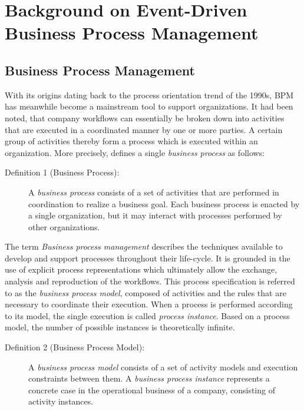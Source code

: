 \chapter{Background on Event-Driven Business Process Management}\label{ch:background}

\section{Business Process Management}
With its origins dating back to the process orientation trend of the 1990s, \ac{BPM} has meanwhile become a mainstream tool to support organizations.
It had been noted, that company workflows can essentially be broken down into activities that are executed in a coordinated manner by one or more parties.
A certain group of activities thereby form a process which is executed within an organization.
More precisely, \citeauthor{weske:bpm-book} \cite{weske:bpm-book} defines a single \emph{business process} as follows:

\begin{description}
	\item[Definition 1 (Business Process):]
	A \emph{business process} consists of a set of activities that are performed in coordination to realize a business goal. Each business process is enacted by a single organization, but it may interact with processes performed by other organizations. \cite[p.~5]{weske:bpm-book}
\end{description}

\noindent The term \emph{Business process management} describes the techniques available to develop and support processes throughout their life-cycle.
It is grounded in the use of explicit process representations which ultimately allow the exchange, analysis and reproduction of the workflows.
This process specification is referred to as the \emph{business process model}, composed of activities and the rules that are necessary to coordinate their execution. When a process is performed according to its model, the single execution is called \textit{process instance}.
Based on a process model, the number of possible instances is theoretically infinite.

\begin{description}
	\item[Definition 2 (Business Process Model):]
	A \emph{business process model} consists of a set of activity models and execution constraints between them. A \emph{business process instance} represents a concrete case in the operational business of a company, consisting of activity instances.
	\cite[p.~7]{weske:bpm-book}
\end{description}

